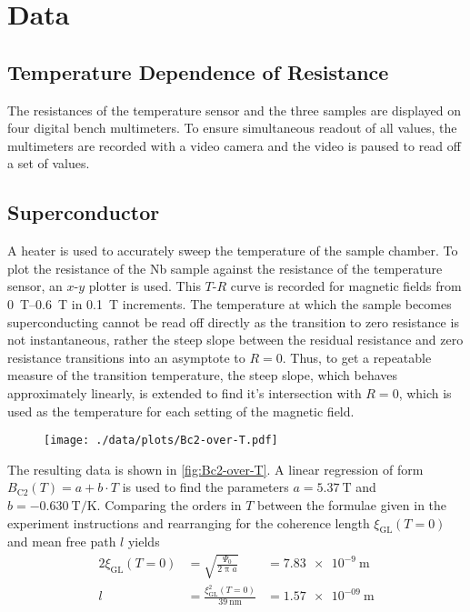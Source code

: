 \chapter{Data}
\section{Temperature Dependence of Resistance}
The resistances of the temperature sensor and the three samples are displayed on four digital bench multimeters.
To ensure simultaneous readout of all values, the multimeters are recorded with a video camera and the video is paused to read off a set of values.

\section{Superconductor}
A heater is used to accurately sweep the temperature of the sample chamber.
To plot the resistance of the Nb sample against the resistance of the temperature sensor, an $x$-$y$ plotter is used.
This $T$-$R$ curve is recorded for magnetic fields from \SIrange{0}{0.6}{\tesla} in \SI{0.1}{\tesla} increments.
The temperature at which the sample becomes superconducting cannot be read off directly as the transition to zero resistance is not instantaneous, rather the steep slope between the residual resistance and zero resistance transitions into an asymptote to $R = 0$.
Thus, to get a repeatable measure of the transition temperature, the steep slope, which behaves approximately linearly, is extended to find it's intersection with $R = 0$, which is used as the temperature for each setting of the magnetic field.
\begin{figure}
	\centering
	\texttt{[image: ./data/plots/Bc2-over-T.pdf]}
	\label{fig:Bc2-over-T}
\end{figure}
The resulting data is shown in \autoref{fig:Bc2-over-T}.
A linear regression of form $B_\text{C2}(T) = a + b \cdot T$ is used to find the parameters $a = \SI{5.37}{\tesla}$ and $b = \SI{-0.630}{\tesla\per\kelvin}$.
Comparing the orders in $T$ between the formulae given in the experiment instructions and rearranging for the coherence length $\xi_\text{GL}(T = 0)$ and mean free path $l$ yields
\begin{alignat*}{2}
	\xi_\text{GL}(T = 0) &= \sqrt{\frac{\Psi_0}{2 \uppi a}} &= \SI{7.83e-9}{\meter}\\
	l &= \frac{\xi^2_\text{GL}(T = 0)}{\SI{39}{\nano\meter}} &= \SI{1.57e-09}{\meter}
\end{alignat*}

